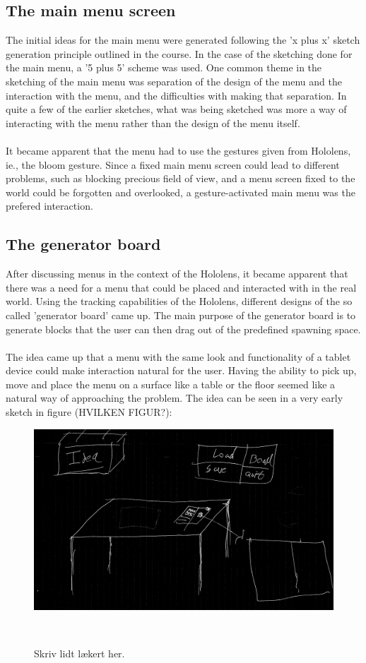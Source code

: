 \subsection{The main menu screen}
The initial ideas for the main menu were generated following the 'x plus x' sketch generation principle outlined in the course. In the case of the sketching done for the main menu, a '5 plus 5' scheme was used. One common theme in the sketching of the main menu was separation of the design of the menu and the interaction with the menu, and the difficulties with making that separation. In quite a few of the earlier sketches, what was being sketched was more a way of interacting with the menu rather than the design of the menu itself.\\
\\
It became apparent that the menu had to use the gestures given from Hololens, ie., the bloom gesture. Since a fixed main menu screen could lead to different problems, such as blocking precious field of view, and a menu screen fixed to the world could be forgotten and overlooked, a gesture-activated main menu was the prefered interaction.

\subsection{The generator board}
After discussing menus in the context of the Hololens, it became apparent that there was a need for a menu that could be placed and interacted with in the real world. Using the tracking capabilities of the Hololens, different designs of the so called 'generator board' came up. The main purpose of the generator board is to generate blocks that the user can then drag out of the predefined spawning space.\\
\\
The idea came up that a menu with the same look and functionality of a tablet device could make interaction natural for the user. Having the ability to pick up, move and place the menu on a surface like a table or the floor seemed like a natural way of approaching the problem. The idea can be seen in a very early sketch in figure (HVILKEN FIGUR?):\\
\begin{figure}
\centering
  \includegraphics[width=0.9\columnwidth]{figures/Generator/gen6.png}
  \caption{Skriv lidt lækert her. }~\label{fig:genboard}
\end{figure}

